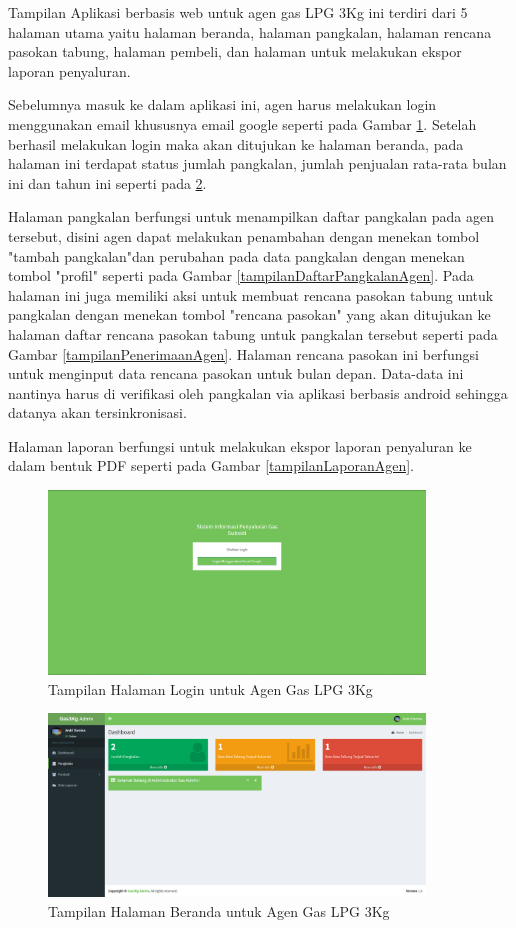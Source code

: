 	\par Tampilan Aplikasi berbasis web untuk agen gas LPG 3Kg ini terdiri dari 5 halaman utama yaitu halaman beranda, halaman pangkalan, halaman rencana pasokan tabung, halaman pembeli, dan halaman untuk melakukan ekspor laporan penyaluran.
	\par Sebelumnya masuk ke dalam aplikasi ini, agen harus melakukan login menggunakan email khususnya email google seperti pada Gambar \ref{tampilanLoginAgen}. Setelah berhasil melakukan login maka akan ditujukan ke halaman beranda, pada halaman ini terdapat status jumlah pangkalan, jumlah penjualan rata-rata bulan ini dan tahun ini seperti pada \ref{tampilanBerandaAgen}.
	\par Halaman pangkalan berfungsi untuk menampilkan daftar pangkalan pada agen tersebut, disini agen dapat melakukan penambahan dengan menekan tombol "tambah pangkalan"dan perubahan pada data pangkalan dengan menekan tombol "profil" seperti pada Gambar \ref{tampilanDaftarPangkalanAgen}. Pada halaman ini juga memiliki aksi untuk membuat rencana pasokan tabung untuk pangkalan dengan menekan tombol "rencana pasokan" yang akan ditujukan ke halaman daftar rencana pasokan tabung untuk pangkalan tersebut seperti pada Gambar \ref{tampilanPenerimaanAgen}. Halaman rencana pasokan ini berfungsi untuk menginput data rencana pasokan untuk bulan depan. Data-data ini nantinya harus di verifikasi oleh pangkalan via aplikasi berbasis android sehingga datanya akan tersinkronisasi.
	\par Halaman laporan berfungsi untuk melakukan ekspor laporan penyaluran ke dalam bentuk PDF seperti pada Gambar \ref{tampilanLaporanAgen}.
	
	\begin{figure}[H]
		\center
		\includegraphics [width = 10cm]{gambar/web/login}
		\caption{Tampilan Halaman Login untuk Agen Gas LPG 3Kg}
		\label{tampilanLoginAgen}
	\end{figure}
	
	\begin{figure}[H]
		\center
		\includegraphics [width = 10cm]{gambar/web/beranda}
		\caption{Tampilan Halaman Beranda untuk Agen Gas LPG 3Kg}
		\label{tampilanBerandaAgen}
	\end{figure}

